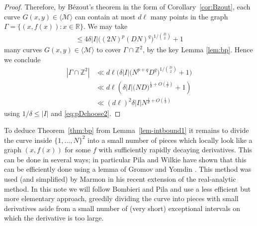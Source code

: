 \documentclass[12pt]{amsart}
\newcommand{\Z}{{\mathbb Z}}
\newcommand{\1}{{\mathbf 1}}
\theoremstyle{remark}
\theoremstyle{definition}
\begin{document}
\begin{proof}
Therefore, by B\'ezout's theorem in the form of Corollary~\ref{cor:Bzout}, each curve $G(x,y)\in\langle \mathcal{M}\rangle$ can contain at most $d\ell$ many points in the graph $\Gamma=\{(x,f(x)) : x\in\mathbb{R}\}$. We may take
\begin{align*}
\le 4\delta|I| \big((2N)^{p}(DN)^q\big)^{1/\binom{D}{2}}+1
\end{align*}
many curves $G(x,y)\in\langle \mathcal{M}\rangle$ to cover $\Gamma\cap\Z^2$, by the key Lemma \ref{lem:bp}.
 Hence we conclude
\begin{align*}
|\Gamma\cap \Z^2|
&\ll d\ell\Big(\delta\lvert I\rvert\big(N^{p+q}D^q\big)^{1/\binom{D}{2}}+1\Big) \\
&\ll d\ell\left( \delta\lvert I\rvert\big(ND\big)^{\frac{1}{d}+O(\frac{1}{\ell})}+1\right) \\
& \ll (d\ell)^2 \delta\lvert I\rvert N^{\frac{1}{d}+O(\frac{1}{\ell})}
\end{align*}
using $1/\delta \le |I|$ and \eqref{eq:pDchoose2}.
\end{proof}

To deduce Theorem~\ref{thm:bp} from Lemma~\ref{lem-intbound1} it remains to divide the curve inside $\{1,\ldots,N\}^2$ into a small number of pieces which locally look like a graph $(x,f(x))$ for some $f$ with sufficiently rapidly decaying derivatives. This can be done in several ways; in particular Pila and Wilkie \cite{PW06} have shown that this can be efficiently done using a lemma of Gromov \cite{Gr87} and Yomdin \cite{Yo87}. This method was used (and simplified) by Marmon \cite{Ma10} in his recent extension of the real-analytic method. In this note we will follow Bombieri and Pila and use a less efficient but more elementary approach, greedily dividing the curve into pieces with small derivatives aside from a small number of (very short) exceptional intervals on which the derivative is too large.
\end{document}
